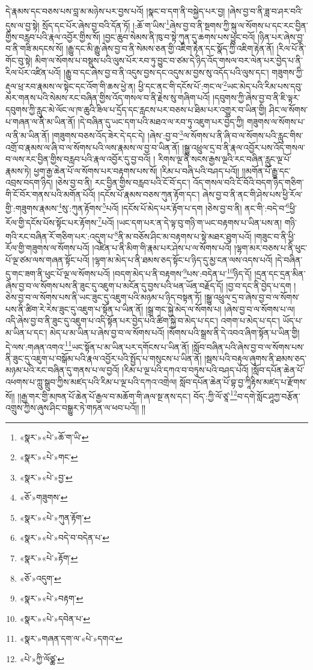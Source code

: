 དེ་རྣམས་དང་བཅས་པས་བླ་མ་མཉེས་པར་བྱས་པའོ། །སྣང་བ་དག་ནི་བསྐྱེད་པར་བྱ། །ཞེས་བྱ་བ་ནི་ཟླ་བ་ཤར་བའི་དུས་ལ་བྱ་སྟེ། སྲོད་དང་པོར་ཞེས་བྱ་བའི་དོན་ཏོ། །:ཆོ་ག་ཡིས་\footnote{«སྣར་»«པེ་»ཆོ་ག་ཡི་}ཞེས་བྱ་བ་ནི་སྔགས་ཀྱི་སྐུ་ལ་སོགས་པ་དང་རང་བྱིན་གྱིས་བརླབ་པའི་རྣལ་འབྱོར་གྱིས་སོ། །བྱང་ཆུབ་སེམས་ནི་ཁུ་བ་སྟེ་ཀུན་དུ་ཆགས་པས་ཕྱུང་བའོ། །ཉིན་པར་ཞེས་བྱ་བ་ནི་གཟི་མདངས་སོ། །རྒྱུ་དང་མི་རྒྱུ་ཞེས་བྱ་བ་ནི་སེམས་ཅན་གྱི་འཇིག་རྟེན་དང་སྣོད་ཀྱི་འཇིག་རྟེན་ནོ། །རིལ་པོ་ནི་གོང་བུ་སྟེ། མིག་ལ་སོགས་པ་བསྡུས་པའི་ལུས་པོར་རབ་ཏུ་བྱུང་བ་ཙམ་དེ་ཉིད་འོད་གསལ་བར་ལེན་པར་བྱེད་པ་ནི་རིལ་པོར་འཛིན་པའོ། །རྒྱུ་བ་དང་ཞེས་བྱ་བ་ནི་འདུས་བྱས་དང་འདུས་མ་བྱས་སུ་འདོད་པའི་ལུས་དང་། གཟུགས་ཀྱི་རྡུལ་ཕྲ་རབ་རྣམས་ལ་སྟེང་དང་འོག་གི་ཆས་ཕྱེ་ན། ཕྱི་དང་ནང་གི་དངོས་པོ་:གང་ལ་\footnote{«སྣར་»«པེ་»གང་}ཡང་མེད་པའི་རིམ་པས་དབུ་མར་གནས་པའི་སེམས་རང་བཞིན་གྱིས་འོད་གསལ་བ་ནི་རྗེས་སུ་གཞིག་པའོ། །དབུགས་ཀྱི་ཞེས་བྱ་བ་ནི་ཇི་ལྟར་དབུགས་ཀྱི་རླུང་མེ་ལོང་ལ་ཁ་ཆུའི་ཟིལ་པ་དྲོད་དང་རླངས་པར་བཅས་པ་ཐིམ་པར་འགྱུར་བ་ཡིན་གྱི། ཤིང་ལ་སོགས་པ་གཞན་ལ་ནི་མ་ཡིན་ནོ། །དེ་བཞིན་དུ་ཡང་དག་པའི་མཐའ་ལ་རབ་ཏུ་འཇུག་པར་བྱེད་ཀྱི། གཟུགས་ལ་སོགས་པ་ལ་ནི་མ་ཡིན་ནོ། །གཟུགས་བཅས་འོད་ཟེར་དེ་དང་དེ། །ཞེས་:བྱ་བ་\footnote{«སྣར་»«པེ་»བྱ་}ལ་སོགས་པ་ནི་ཞི་བ་ལ་སོགས་པའི་རླུང་གིས་འགྲོ་བ་རྣམས་ལ་ཞི་བ་ལ་སོགས་པའི་ལས་རྣམས་ལ་བྱ་བ་ཡིན་ནོ། །སྒྱུ་འཕྲུལ་དྲ་བ་ནི་རྣལ་འབྱོར་པས་འོད་གསལ་བ་ལས་རང་བྱིན་གྱིས་བརླབ་པའི་རྣལ་འབྱོར་དུ་བྱ་བའོ། །
རིགས་ལྔ་ནི་སངས་རྒྱས་ལྔའི་རང་བཞིན་རླུང་ལྔ་པོ་རྣམས་ཏེ། ཕྱག་རྒྱ་ཆེན་པོ་ལ་སོགས་པར་བརྟགས་པས་སོ། །རིམ་པ་བཞི་པའི་བཤད་པའོ།། །།མགོན་པོ་རྒྱུ་དང་འབྲས་བདག་ཉིད། །ཅེས་བྱ་བ་ནི། རང་བྱིན་གྱིས་བརླབ་པའི་ངོ་བོ་དང་། འོད་གསལ་བའི་ངོ་བོའི་བདག་ཉིད་གཅིག་གི་ངོ་བོར་གནས་པའི་མགོན་པོའོ། །དངོས་པོ་རྣམས་བཅས་ཀུན་རྟོག་དང་། ཞེས་བྱ་བ་ནི་ནང་གི་ཤེས་པས་ཕྱི་རོལ་གྱི་:གཟུགས་རྣམས་\footnote{«ཅོ་»གཟུགས་}སུ་:ཀུན་རྟོགས་\footnote{«སྣར་»«པེ་»ཀུན་རྟོག་}པའོ། །དངོས་པོ་མེད་པར་རྟོག་པ་དག །ཅེས་བྱ་བ་ནི། ནང་གི་:བདེ་བ་\footnote{«སྣར་»«པེ་»བདེ་བ་བདེན་པ་}ཕྱི་རོལ་གྱི་དངོས་པོས་སྟོང་པར་རྟོགས་\footnote{«སྣར་»«པེ་»རྟོག་}པའོ། །ཡང་དག་པར་ན་དེ་ལྟ་བུ་གཉི་ག་ཡང་བརྟགས་པ་ཡིན་པས་ན། གཉི་གའི་རང་བཞིན་རོ་གཅིག་པར་:འདུག་པ་\footnote{«ཅོ་»འདུག་}ནི་མ་བཅོས་ཤིང་མ་བརྟགས་པ་སྟེ་མཐར་ཐུག་པའོ། །གཟུང་བ་ནི་ཕྱི་རོལ་གྱི་གཟུགས་ལ་སོགས་པའོ། །འཛིན་པ་ནི་མིག་གི་རྣམ་པར་ཤེས་པ་ལ་སོགས་པའོ། །ལྷག་མར་བཅས་པ་ནི་ཕུང་པོ་ལྔ་ཙམ་ལས་གཞན་སྟོང་པའོ། །ལྷག་མ་མེད་པ་ནི་ཐམས་ཅད་སྟོང་པ་ཉིད་དུ་མྱ་ངན་ལས་འདས་པའོ། །དེ་བཞིན་དུ་གང་ཟག་ནི་ཕུང་པོ་ལྔ་ལ་སོགས་པའོ། །བདག་མེད་པ་ནི་བརྟགས་\footnote{«སྣར་»«པེ་»བརྟག་}པས་:བདེན་པ་\footnote{«སྣར་»«པེ་»དབེན་པ་}ཉིད་དོ། །དྲན་དང་དྲན་མིན་ཞེས་བྱ་བ་ལ་སོགས་པས་ནི་ཟུང་དུ་འཇུག་པ་མངོན་དུ་བྱས་པའི་ཕན་ཡོན་བརྗོད་དོ། །བྱ་བ་དང་ནི་བྱེད་པ་དག །ཅེས་བྱ་བ་ལ་སོགས་པས་ནི་ཡང་ཟུང་དུ་འཇུག་པའི་མཉམ་པ་ཉིད་བསྟན་ཏོ། །སྒྱུ་འཕྲུལ་དྲ་བ་ཞེས་བྱ་བ་ལ་སོགས་པས་ནི་ཚིག་རེ་རེས་ཟུང་དུ་འཇུག་པ་སྟོན་པ་ཡིན་ནོ། །སྒྲ་གང་སྐྱེ་མེད་ལ་སོགས་པ། །ཞེས་བྱ་བ་ལ་སོགས་པ་ལ། འདི་ཞེས་བྱ་བ་ནི་ཟུང་དུ་འཇུག་པ་འདི་སྟོན་པར་བྱེད་པའི་ཚིག་སྐྱེ་བ་མེད་པ་དང་། འགག་པ་མེད་པ་དང་། ཡོད་པ་མ་ཡིན་པ་དང་། མེད་པ་མ་ཡིན་པ་ཞེས་བྱ་བ་ལ་སོགས་པའོ། །སོགས་པའི་སྒྲས་ནི་དེ་འབའ་ཞིག་སྟོན་པ་ཡིན་གྱི། དེ་ལས་:གཞན་འགའ་\footnote{«སྣར་»གཞན་དག་ལ་«པེ་»དགའ་}ཡང་སྟོན་པ་མ་ཡིན་པར་དགོངས་པ་ཡིན་ནོ། །སློབ་བཞིན་པའི་ཞེས་བྱ་བ་ལ་སོགས་པས་ནི་ཟུང་དུ་འཇུག་པ་བསྒོམ་པའི་རྣལ་འབྱོར་པའི་སྤྱོད་པ་གསུངས་པ་ཡིན་ནོ། །སྦས་པའི་བརྟུལ་ཞུགས་ནི་ཐམས་ཅད་མཉམ་པའི་རང་བཞིན་དུ་གནས་པ་ལ་བྱའོ། །རིམ་པ་ལྔ་པའི་དཀའ་བ་བཏུས་པའི་བཤད་པའོ། །སློབ་དཔོན་ཆེན་པོ་འཕགས་པ་ཀླུ་སྒྲུབ་ཀྱིས་མཛད་པའི་རིམ་པ་ལྔ་པའི་དཀའ་འགྲེལ། སློབ་དཔོན་ཆེན་པོ་བྷ་བྱ་ཀཱིརྟིས་མཛད་པ་རྫོགས་སོ།། །།རྒྱ་གར་གྱི་མཁན་པོ་ཆེན་པོ་རྒྱལ་བ་མཆོག་གི་ཞལ་སྔ་ནས་དང་། བོད་:ཀྱི་ལོ་ཙཱ་\footnote{«པེ་»ཀྱི་ལོཙྪ་}བ་དགེ་སློང་ཤཱཀྱ་བརྩོན་འགྲུས་ཀྱིས་ཞུས་ཤིང་བསྒྱུར་ཏེ་གཏན་ལ་ཕབ་པའོ།། །།